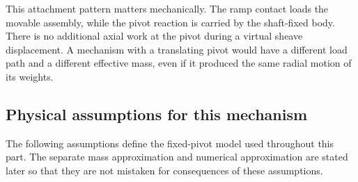 \documentclass[11pt,letterpaper]{article}
\numberwithin{equation}{section}
\begin{document}
This attachment pattern matters mechanically. The ramp contact loads the movable assembly, while the pivot reaction is carried by the shaft-fixed body. There is no additional axial work at the pivot during a virtual sheave displacement. A mechanism with a translating pivot would have a different load path and a different effective mass, even if it produced the same radial motion of its weights.

\subsection{Physical assumptions for this mechanism}

The following assumptions define the fixed-pivot model used throughout this part. The separate mass approximation and numerical approximation are stated later so that they are not mistaken for consequences of these assumptions.
\end{document}
